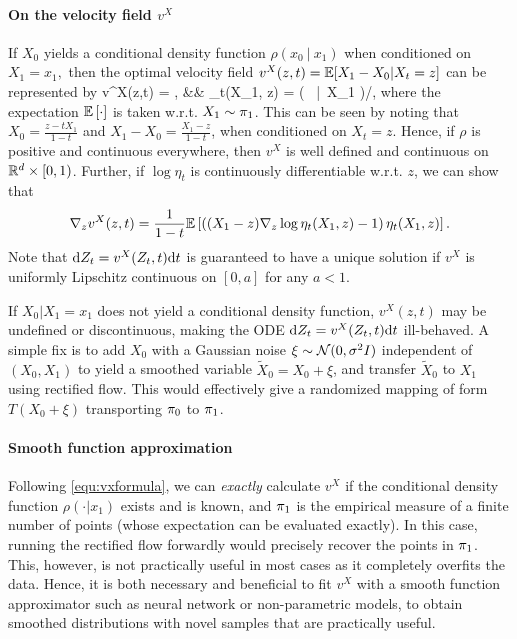 \paragraph{%
On the velocity field $v^X$}   
If  $X_0$ yields a conditional density function $\rho(x_0~|~x_1)$ when conditioned on $X_1 = x_1,$  %
then the optimal velocity field $v^X(z,t) = \mathbb{E}[X_1-X_0|X_t=z]$ can be represented by %
\bbb  \label{equ:vxformula}
v^X(z,t) = , 
&&
\eta_t(X_1, z) = {\rho\left ( ~\bigg |~X_1 \right )}\bigg  /{},
\eee 
where the expectation $\mathbb{E}\left[\cdot\right]$ is taken w.r.t. $X_1\sim {\pi}_1$. This can be seen by noting that $X_0 = \frac{z-t X_1}{1-t}$ and $X_1-X_0 = \frac{X_1-z}{1-t}$, when conditioned on $X_t = z$.
Hence, if  $\rho$ is positive and continuous everywhere, then $v^X$ is well defined and continuous on $\mathbb{R}^d\times [0,1)$. 
Further, if $\log \eta_t$ is continuously differentiable w.r.t. $z$, we can show that 
$$
\nabla_z v^X(z,t) = 
\frac{1}{1-t} \mathbb{E}\left [ 
\left (({X_1-z}) \nabla_z \log \eta_t(X_1,z) - 1 \right ) \eta_t(X_1,z) 
\right]. 
$$
Note that $\mathrm{d} Z_t = v^X(Z_t,t)\mathrm{d}t $ 
is guaranteed to have a unique solution if 
$v^X$ is uniformly Lipschitz continuous on $[0,a]$ for any $a<1$.



If %
$X_0|X_1=x_1$ does not yield a conditional density function, 
$v^X(z,t)$ may be undefined or discontinuous, 
making the %
ODE $\mathrm{d} Z_t = v^X(Z_t,t)\mathrm{d}t$ 
ill-behaved. 
A simple fix is to add $X_0$ with a Gaussian noise $\xi \sim \mathcal{N}(0, \sigma^2I)$ independent of $(X_0,X_1)$ to yield a smoothed variable $\tilde X_0 = X_0 +  \xi$, and transfer $\tilde X_0$ to $X_1$ using rectified flow.  
This would effectively give a randomized mapping of form $T(X_0 + \xi)$ transporting  ${\pi}_0$ to ${\pi}_1$. %















\paragraph{Smooth function approximation}
%
Following \eqref{equ:vxformula}, 
we can \emph{exactly} calculate $v^X$ 
if the conditional density function $\rho(\cdot|x_1)$ exists and is known, 
and ${\pi}_1$ is the empirical measure of a finite number of points (whose expectation can be evaluated exactly). 
In this case, running the rectified flow 
forwardly would 
precisely recover the points in ${\pi}_1$. 
This, however, is not practically useful in most cases as it completely overfits the data.
Hence, it is both necessary and beneficial 
to fit 
$v^X$ with a smooth function approximator such as neural network or non-parametric models, 
to obtain 
smoothed distributions  
with novel samples 
that  are %
practically useful.  







